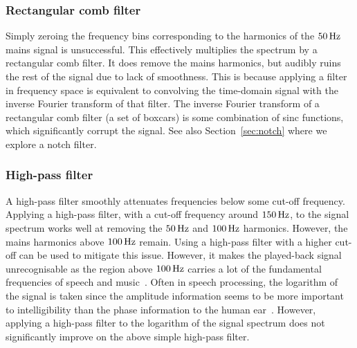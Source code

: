 \documentclass[paper-main.tex]{subfiles}
\begin{document}
\subsubsection{Rectangular comb filter}

Simply zeroing the frequency bins corresponding to the harmonics of the $50\,{\rm Hz}$ mains signal is unsuccessful. This effectively multiplies the spectrum by a rectangular comb filter. It does remove the mains harmonics, but audibly ruins the rest of the signal due to lack of smoothness. This is because applying a filter in frequency space is equivalent to convolving the time-domain signal with the inverse Fourier transform of that filter. The inverse Fourier transform of a rectangular comb filter (a set of boxcars) is some combination of sinc functions, which significantly corrupt the signal. 
See also Section~\ref{sec:notch} where we explore a notch filter. 


\subsubsection{High-pass filter}

A high-pass filter smoothly attenuates frequencies below some cut-off frequency. Applying a high-pass filter, with a cut-off frequency around $150\,{\rm Hz}$, to the signal spectrum works well at removing the $50\,{\rm Hz}$ and $100\,{\rm Hz}$ harmonics. However, the mains harmonics above $100\,{\rm Hz}$ remain. Using a high-pass filter with a higher cut-off can be used to mitigate this issue. However, it makes the played-back signal unrecognisable as the region above $100\,{\rm Hz}$ carries a lot of the fundamental frequencies of speech and music~\cite{speech_intelligibility}.
Often in speech processing, the logarithm of the signal is taken since the amplitude information seems to be more important to intelligibility than the phase information to the human ear~\cite{SubjectiveComparison}. However, applying a high-pass filter to the logarithm of the signal spectrum does not significantly improve on the above simple high-pass filter.
\end{document}
